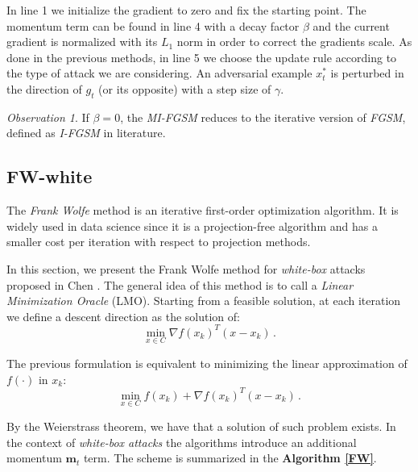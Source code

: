 \documentclass[10pt,twocolumn,letterpaper, english]{article}
\theoremstyle{definition}
\theoremstyle{plain}
\theoremstyle{plain}
\theoremstyle{plain}
\theoremstyle{plain}
\theoremstyle{remark}
\newtheorem{osservazione}{Observation}[section]
\theoremstyle{remark}
\theoremstyle{definition}
\theoremstyle{definition}
\theoremstyle{definition}
\theoremstyle{definition}
\begin{document}
In line 1 we initialize the gradient to zero and fix the starting point.
The momentum term can be found in line 4 with a decay factor $\beta$ and the current gradient is normalized with its $L_1$ norm in order to correct the gradients scale.
As done in the previous methods, in line 5 we choose the update rule according to the type of attack we are considering.
An adversarial example $x_{t}^{\ast}$ is perturbed in the direction of $g_t$ (or its opposite) with a step size of $\gamma$. 


\begin{osservazione}
If $\beta = 0$, the \textit{MI-FGSM} reduces to the iterative version of \textit{FGSM}, defined as \textit{I-FGSM} in literature.
\end{osservazione}


\subsection{FW-white}

The \textit{Frank Wolfe} method is an iterative first-order optimization algorithm. 
It is widely used in data science since it is a projection-free algorithm and has a smaller cost per iteration with respect to projection methods.

In this section, we present the Frank Wolfe method for \textit{white-box} attacks proposed in Chen \cite{frank}. 
The general idea of this method is to call a \textit{Linear Minimization Oracle} (LMO). 
Starting from a feasible solution, at each iteration we define a descent direction as the solution of:
\begin{equation*}
    \min_{x \in C}\nabla f(x_k)^T (x-x_k)\,.
\end{equation*}

The previous formulation is equivalent to minimizing the linear approximation of $f(\cdot)$ in $x_k$:
\begin{equation*}
    \min_{x \in C} f(x_k) + \nabla f(x_k)^T (x-x_k)\,.
\end{equation*}

By the Weierstrass theorem, we have that a solution of such problem exists.
In the context of \textit{white-box attacks} the algorithms introduce an additional momentum $\textbf{m}_t$ term. 
The scheme is summarized in the \textbf{Algorithm \ref{FW}}.
\end{document}

